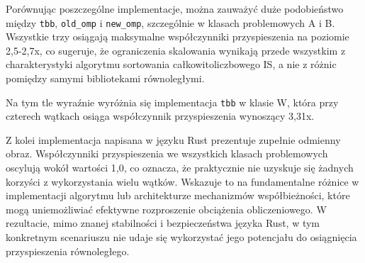 Porównując poszczególne implementacje, można zauważyć duże podobieństwo między \texttt{tbb}, \texttt{old\_omp} i \texttt{new\_omp}, szczególnie w klasach problemowych A i B. Wszystkie trzy osiągają maksymalne współczynniki przyspieszenia na poziomie 2,5-2,7x, co sugeruje, że ograniczenia skalowania wynikają przede wszystkim z charakterystyki algorytmu sortowania całkowitoliczbowego IS, a nie z różnic pomiędzy samymi bibliotekami równoległymi.

Na tym tle wyraźnie wyróżnia się implementacja \texttt{tbb} w klasie W, która przy czterech wątkach osiąga współczynnik przyspieszenia wynoszący 3,31x.

Z kolei implementacja napisana w języku Rust prezentuje zupełnie odmienny obraz. Współczynniki przyspieszenia we wszystkich klasach problemowych oscylują wokół wartości 1,0, co oznacza, że praktycznie nie uzyskuje się żadnych korzyści z wykorzystania wielu wątków. Wskazuje to na fundamentalne różnice w implementacji algorytmu lub architekturze mechanizmów współbieżności, które mogą uniemożliwiać efektywne rozproszenie obciążenia obliczeniowego. W rezultacie, mimo znanej stabilności i bezpieczeństwa języka Rust, w tym konkretnym scenariuszu nie udaje się wykorzystać jego potencjału do osiągnięcia przyspieszenia równoległego.

